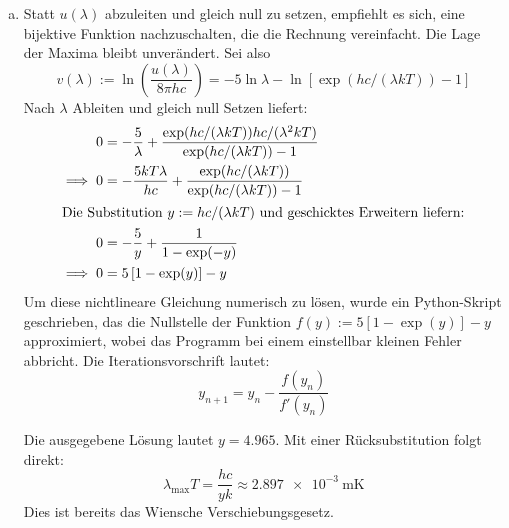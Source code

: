 \begin{enumerate}[(a)]
\item Statt $u(\lambda)$ abzuleiten und gleich null zu setzen, empfiehlt es sich, eine bijektive Funktion nachzuschalten, die die Rechnung vereinfacht. Die Lage der Maxima bleibt unverändert. Sei also
\begin{equation}
v(\lambda) := \ln\left(\frac{u(\lambda)}{8\pi hc} \right) = -5\ln{\lambda} - \ln\left[ \exp(hc/(\lambda k T))-1\right]
\end{equation}
Nach $\lambda$ Ableiten und gleich null Setzen liefert:
\begin{align}
0 &= -\frac{5}{\lambda} + \frac{\exp(hc/(\lambda k T))hc/(\lambda^2 k T)}{\exp(hc/(\lambda k T))-1} \\
\implies 0 &= -\frac{5kT\lambda}{hc} +\frac{\exp(hc/(\lambda k T))}{\exp(hc/(\lambda k T))-1} \\
\intertext{Die Substitution $y:=hc/(\lambda k T)$ und geschicktes Erweitern liefern:}
0 &= -\frac{5}{y} + \frac{1}{1-\exp(-y)} \\
\implies 0 &= 5\left[ 1-\exp(y)\right] - y 
\end{align}
Um diese nichtlineare Gleichung numerisch zu lösen, wurde ein Python-Skript geschrieben, das die Nullstelle der Funktion $f(y):=5\left[ 1-\exp(y)\right] - y$ approximiert, wobei das Programm bei einem einstellbar kleinen Fehler abbricht. Die Iterationsvorschrift lautet:
\begin{equation}
y_{n+1} = y_n - \frac{f(y_n)}{f'(y_n)}
\end{equation}



Die ausgegebene Lösung lautet $y = \num{4.965}$. Mit einer Rücksubstitution folgt direkt:
\begin{equation}
\lambda_\text{max} T = \frac{hc}{yk} \approx \SI{2.897e-3}{\meter\kelvin}
\end{equation}
Dies ist bereits das Wiensche Verschiebungsgesetz.
\end{enumerate}